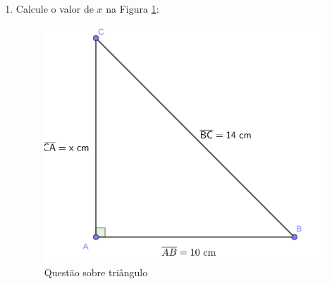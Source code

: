 \documentclass[a4paper, 12pt]{article}
\begin{document}
\begin{enumerate}
     \item Calcule o valor de $x$ na Figura \ref{meu-rotulo}:
    
    \begin{figure}[H]
        \centering
        \includegraphics[scale=1]{imagens/exercicio.png} %
        \caption{Questão sobre triângulo} 
        \label{meu-rotulo} 
    \end{figure}

\end{enumerate}
\end{document}
